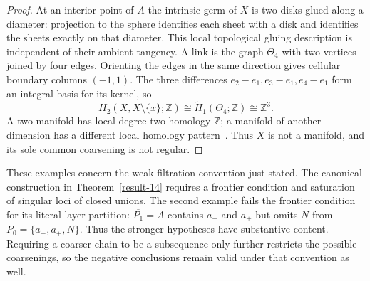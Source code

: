 \begin{proof}
At an interior point of $A$ the intrinsic germ of $X$ is two disks
glued along a diameter: projection to the sphere identifies each
sheet with a disk and identifies the sheets exactly on that
diameter.  This local topological gluing description is
independent of their ambient tangency.  A link is the graph
$\Theta_4$ with two vertices joined by four edges.  Orienting the
edges in the same direction gives cellular boundary columns
$(-1,1)$.  The three differences $e_2-e_1,e_3-e_1,e_4-e_1$
form an integral basis for its kernel, so
\[
 H_2(X,X\setminus\{x\};\mathbb Z)
 \cong\widetilde H_1(\Theta_4;\mathbb Z)
 \cong\mathbb Z^3.
\]
A two-manifold has local degree-two homology $\mathbb Z$; a
manifold of another dimension has a different local homology
pattern~\cite[p.~126]{Hatcher2002Algebraic}.  Thus $X$ is not a manifold, and its sole common
coarsening is not regular.
\end{proof}

These examples concern the weak filtration convention just stated.
The canonical construction in Theorem~\ref{result-14} requires a
frontier condition and saturation of singular loci of closed unions.
The second example fails the frontier condition for its literal
layer partition: $\overline{P_1}=A$ contains $a_-$ and $a_+$ but
omits $N$ from $P_0=\{a_-,a_+,N\}$.  Thus the stronger
hypotheses have substantive content.  Requiring a coarser chain
to be a subsequence only further restricts the possible coarsenings,
so the negative conclusions remain valid under that convention
as well.
